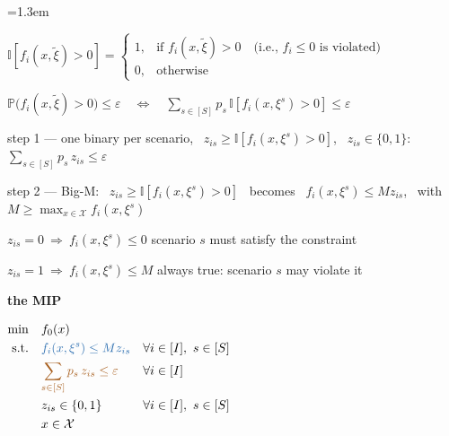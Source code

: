 \documentclass[10pt]{article}
\newenvironment{board}{%
  \par\vspace{4pt}
  \begingroup\leftskip=1.3em\relax\parskip=2pt\relax}{%
  \par\endgroup\vspace{4pt}}
\newcommand{\Prob}{\mathbb{P}}
\newcommand{\ind}[1]{\mathbb{I}[#1]}
\newcommand{\xit}{\tilde\xi}
\begin{document}
\begin{board}
\begin{minipage}{\dimexpr\linewidth-1.3em\relax}
\begin{center}
$\ind{f_i(x, \xit) > 0} = \begin{cases} 1, & \text{if } f_i(x, \xit) > 0 \quad \text{(i.e., } f_i \le 0 \text{ is violated)} \\ 0, & \text{otherwise} \end{cases}$
\end{center}
\vspace{2pt}

\begin{center}
$\displaystyle \Prob\big(f_i(x, \xit) > 0\big) \le \varepsilon \quad\iff\quad \sum_{s \in [S]} p_s\, \ind{f_i(x, \xi^s) > 0} \le \varepsilon$
\end{center}
\end{minipage}
\vspace{2pt}

\quad step 1 --- one binary per scenario, \ $z_{is} \ge \ind{f_i(x, \xi^s) > 0}$, \ $z_{is} \in \{0, 1\}$: \qquad
$\displaystyle \sum_{s \in [S]} p_s\, z_{is} \le \varepsilon$
\vspace{5pt}

\begin{minipage}{\dimexpr\linewidth-1.3em\relax}
\quad step 2 --- Big-M: \ $z_{is} \ge \ind{f_i(x, \xi^s) > 0}$ \ becomes \ $f_i(x, \xi^s) \le M z_{is}$, \ with $M \ge \max_{x \in \mathcal{X}} f_i(x, \xi^s)$
\vspace{3pt}

\qquad $z_{is} = 0 \ \Rightarrow \ f_i(x, \xi^s) \le 0$ \qquad scenario $s$ must satisfy the constraint
\vspace{2pt}

\qquad $z_{is} = 1 \ \Rightarrow \ f_i(x, \xi^s) \le M$ \qquad always true: scenario $s$ may violate it
\end{minipage}
\vspace{6pt}

\begin{minipage}{\dimexpr\linewidth-1.3em\relax}
\quad \textbf{the MIP}
\vspace{2pt}

\begin{center}
$\begin{aligned}
  \min\quad & f_0(x) \\
  \text{s.t.}\quad & {\color{lineA} f_i(x, \xi^s) \le M z_{is}} && \forall i \in [I],\ s \in [S] \\
                   & {\color{lineB} \sum_{s \in [S]} p_s\, z_{is} \le \varepsilon} && \forall i \in [I] \\
                   & z_{is} \in \{0, 1\} && \forall i \in [I],\ s \in [S] \\
                   & x \in \mathcal{X}
\end{aligned}$
\end{center}
\end{minipage}
\vspace{8pt}


\end{board}
\end{document}
